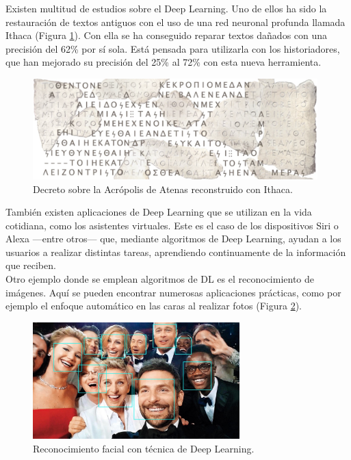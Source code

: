 Existen multitud de estudios sobre el Deep Learning. Uno de ellos ha sido la restauración de textos antiguos con el uso de una red neuronal profunda llamada Ithaca \cite{assael22} (Figura \ref{fig:textos}). Con ella se ha conseguido reparar textos dañados con una precisión del 62\% por sí sola. Está pensada para utilizarla con los historiadores, que han mejorado su precisión del 25\% al 72\% con esta nueva herramienta.\\
\begin{figure} [h!]
  \begin{center}
    \includegraphics[width=11cm]{figs/textos}
  \end{center}
  \caption{Decreto sobre la Acrópolis de Atenas reconstruido con Ithaca.}
  \label{fig:textos}
\end{figure}

También existen aplicaciones de Deep Learning que se utilizan en la vida cotidiana, como los asistentes virtuales.  Este es el caso de los dispositivos Siri o Alexa ---entre otros--- que, mediante algoritmos de Deep Learning, ayudan a los usuarios a realizar distintas tareas, aprendiendo continuamente de la información que reciben.\\

Otro ejemplo donde se emplean algoritmos de DL es el reconocimiento de imágenes. Aquí se pueden encontrar numerosas aplicaciones prácticas, como por ejemplo el enfoque automático en las caras al realizar fotos (Figura \ref{fig:caras}).\\
\begin{figure} [h!]
  \begin{center}
    \includegraphics[width=8cm]{figs/caras}
  \end{center}
  \caption{Reconocimiento facial con técnica de Deep Learning.}
  \label{fig:caras}
\end{figure}

